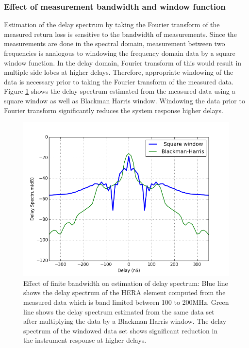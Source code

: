 \documentclass[twocolumn]{emulateapj}
\begin{document}
\subsubsection{\textbf{Effect of measurement bandwidth and window function}}
Estimation of the delay spectrum by taking the Fourier transform of the measured return loss is sensitive to the bandwidth of measurements. Since the measurements are done in the spectral domain, measurement between two frequencies is analogous to windowing the frequency domain data by a square window function. In the delay domain, Fourier transform of this would result in multiple side lobes at higher delays. Therefore, appropriate windowing of the data is  necessary prior to taking the Fourier transform of the measured data. Figure \ref{fig:window} shows the delay spectrum estimated from the measured data using a square window as well as Blackman Harris window. Windowing the data prior to Fourier transform significantly reduces the system response higher delays.  
\begin{figure}
\centering
\includegraphics[width=\linewidth]{plots/window_effect.png}
\caption{Effect of finite bandwidth on estimation of delay spectrum: Blue line shows the delay spectrum of the HERA element computed from the measured data which is band limited between 100 to 200MHz. Green line shows the delay spectrum estimated from the same data set after multiplying the data by a Blackman Harris window. The delay spectrum of the windowed data set shows significant reduction in the instrument response at higher delays.}
\label{fig:window}
\end{figure} 
\end{document}
